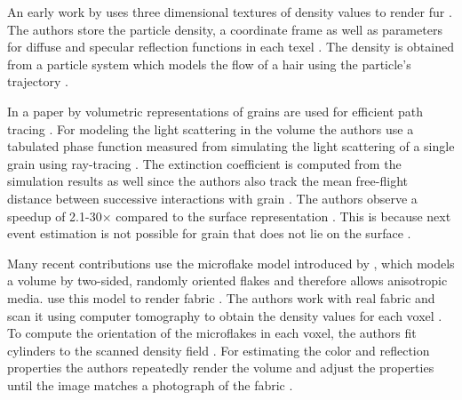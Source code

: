 An early work by \citeauthor{kajiya_rendering_fur_with_textures} uses three dimensional textures of density values to render fur \cite{kajiya_rendering_fur_with_textures}.
The authors store the particle density, a coordinate frame as well as parameters for diffuse and specular reflection functions in each texel \cite{kajiya_rendering_fur_with_textures}.
The density is obtained from a particle system which models the flow of a hair using the particle's trajectory \cite{kajiya_rendering_fur_with_textures}.

In a paper by \citeauthor{meng_multi_scale_modeling_and_rendering_of_granular_materials} volumetric representations of grains are used for efficient path tracing \cite{meng_multi_scale_modeling_and_rendering_of_granular_materials}.
For modeling the light scattering in the volume the authors use a tabulated phase function measured from simulating the light scattering of a single grain using ray-tracing \cite{meng_multi_scale_modeling_and_rendering_of_granular_materials}.
The extinction coefficient is computed from the simulation results as well since the authors also track the mean free-flight distance between successive interactions with grain \cite{meng_multi_scale_modeling_and_rendering_of_granular_materials}.
The authors observe a speedup of 2.1-30$\times$ compared to the surface representation \cite{meng_multi_scale_modeling_and_rendering_of_granular_materials}.
This is because next event estimation is not possible for grain that does not lie on the surface \cite{meng_multi_scale_modeling_and_rendering_of_granular_materials}.

Many recent contributions use the microflake model introduced by \citeauthor{microflake}, which models a volume by two-sided, randomly oriented flakes and therefore allows anisotropic media\cite{microflake}.
\citeauthor{zhao_building_volumetric_appearance_models} use this model to render fabric \cite{zhao_building_volumetric_appearance_models}.
The authors work with real fabric and scan it using computer tomography to obtain the density values for each voxel \cite{zhao_building_volumetric_appearance_models}.
To compute the orientation of the microflakes in each voxel, the authors fit cylinders to the scanned density field \cite{zhao_building_volumetric_appearance_models}.
For estimating the color and reflection properties the authors repeatedly render the volume and adjust the properties until the image matches a photograph of the fabric \cite{zhao_building_volumetric_appearance_models}.

